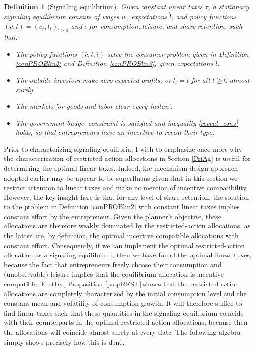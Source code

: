 \documentclass[11pt]{article}
\theoremstyle{plain}
\newtheorem{defn}{Definition}[section]
\begin{document}
\begin{defn}[Signaling equilibrium] \label{SIGE}
Given constant linear taxes $\tau$, a stationary signaling equilibrium consists of wages $w$, expectations $\hat{l}$, and policy functions $(\overline{c},l) = (\overline{c}_t,l_t)_{t\geq0}$ and $\overline{\iota}$ for consumption, leisure, and share retention, such that:
\begin{itemize}
\item The policy functions $(\overline{c},l,\overline{\iota})$ solve the consumer problem given in Definition \ref{conPROBlin2} and Definition \ref{conPROBlin3}, given expectations $\hat{l}$.  
\item The outside investors make zero expected profits, or $l_t = \hat{l}$ for all $t\geq0$ almost surely. 
\item The markets for goods and labor clear every instant. 
\item The government budget constraint is satisfied and inequality \eqref{reveal_cons} holds, so that entrepreneurs have an incentive to reveal their type.
\end{itemize}
\end{defn} 

Prior to characterizing signaling equilibria, I wish to emphasize once more why the characterization of restricted-action allocations in Section \ref{PriAg} is useful for determining the optimal linear taxes. Indeed, the mechanism design approach adopted earlier may be appear to be superfluous given that in this section we restrict attention to linear taxes and make no mention of incentive compatibility. However, the key insight here is that for any level of share retention, the solution to the problem in Definition \ref{conPROBlin2} with constant linear taxes implies constant effort by the entrepreneur. Given the planner's objective, these allocations are therefore weakly dominated by the restricted-action allocations, as the latter are, by definition, the optimal incentive compatible allocations with constant effort. Consequently, if we can implement the optimal restricted-action allocation as a signaling equilibrium, then we have found the optimal linear taxes, because the fact that entrepreneurs freely choose their consumption and (unobservable) leisure implies that the equilibrium allocation is incentive compatible. Further, Proposition \ref{propREST} shows that the restricted-action allocations are completely characterized by the initial consumption level and the constant mean and volatility of consumption growth. It will therefore suffice to find linear taxes such that these quantities in the signaling equilibrium coincide with their counterparts in the optimal restricted-action allocations, because then the allocations will coincide almost surely at every date. The following algebra simply shows precisely how this is done.
\end{document}
